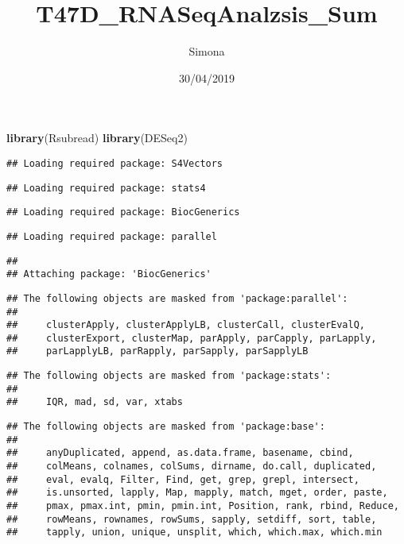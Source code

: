 \documentclass[]{article}
\title{T47D\_RNASeqAnalzsis\_Sum}
\author{Simona}
\date{30/04/2019}
\newenvironment{Shaded}{\begin{snugshade}}{\end{snugshade}}
\newcommand{\KeywordTok}[1]{\textcolor[rgb]{0.13,0.29,0.53}{\textbf{#1}}}
\newcommand{\NormalTok}[1]{#1}
\begin{document}
\maketitle

\begin{Shaded}
\begin{Highlighting}[]
\KeywordTok{library}\NormalTok{(Rsubread)}
\KeywordTok{library}\NormalTok{(DESeq2)}
\end{Highlighting}
\end{Shaded}

\begin{verbatim}
## Loading required package: S4Vectors
\end{verbatim}

\begin{verbatim}
## Loading required package: stats4
\end{verbatim}

\begin{verbatim}
## Loading required package: BiocGenerics
\end{verbatim}

\begin{verbatim}
## Loading required package: parallel
\end{verbatim}

\begin{verbatim}
## 
## Attaching package: 'BiocGenerics'
\end{verbatim}

\begin{verbatim}
## The following objects are masked from 'package:parallel':
## 
##     clusterApply, clusterApplyLB, clusterCall, clusterEvalQ,
##     clusterExport, clusterMap, parApply, parCapply, parLapply,
##     parLapplyLB, parRapply, parSapply, parSapplyLB
\end{verbatim}

\begin{verbatim}
## The following objects are masked from 'package:stats':
## 
##     IQR, mad, sd, var, xtabs
\end{verbatim}

\begin{verbatim}
## The following objects are masked from 'package:base':
## 
##     anyDuplicated, append, as.data.frame, basename, cbind,
##     colMeans, colnames, colSums, dirname, do.call, duplicated,
##     eval, evalq, Filter, Find, get, grep, grepl, intersect,
##     is.unsorted, lapply, Map, mapply, match, mget, order, paste,
##     pmax, pmax.int, pmin, pmin.int, Position, rank, rbind, Reduce,
##     rowMeans, rownames, rowSums, sapply, setdiff, sort, table,
##     tapply, union, unique, unsplit, which, which.max, which.min
\end{verbatim}
\end{document}
